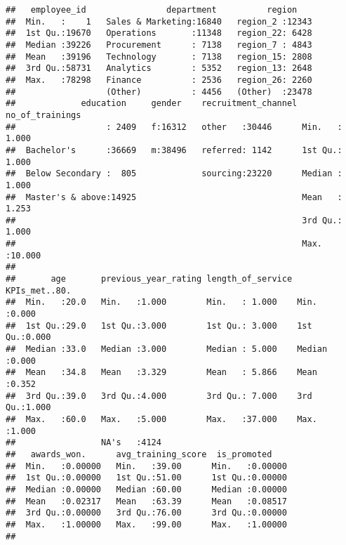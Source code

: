 \documentclass[
]{article}
\newenvironment{Shaded}{\begin{snugshade}}{\end{snugshade}}
\newcommand{\KeywordTok}[1]{\textcolor[rgb]{0.13,0.29,0.53}{\textbf{#1}}}
\newcommand{\NormalTok}[1]{#1}
\newcommand{\OperatorTok}[1]{\textcolor[rgb]{0.81,0.36,0.00}{\textbf{#1}}}
\newcommand{\StringTok}[1]{\textcolor[rgb]{0.31,0.60,0.02}{#1}}
\begin{document}
\begin{verbatim}
##   employee_id                department          region     
##  Min.   :    1   Sales & Marketing:16840   region_2 :12343  
##  1st Qu.:19670   Operations       :11348   region_22: 6428  
##  Median :39226   Procurement      : 7138   region_7 : 4843  
##  Mean   :39196   Technology       : 7138   region_15: 2808  
##  3rd Qu.:58731   Analytics        : 5352   region_13: 2648  
##  Max.   :78298   Finance          : 2536   region_26: 2260  
##                  (Other)          : 4456   (Other)  :23478  
##             education     gender    recruitment_channel no_of_trainings 
##                  : 2409   f:16312   other   :30446      Min.   : 1.000  
##  Bachelor's      :36669   m:38496   referred: 1142      1st Qu.: 1.000  
##  Below Secondary :  805             sourcing:23220      Median : 1.000  
##  Master's & above:14925                                 Mean   : 1.253  
##                                                         3rd Qu.: 1.000  
##                                                         Max.   :10.000  
##                                                                         
##       age       previous_year_rating length_of_service KPIs_met..80.  
##  Min.   :20.0   Min.   :1.000        Min.   : 1.000    Min.   :0.000  
##  1st Qu.:29.0   1st Qu.:3.000        1st Qu.: 3.000    1st Qu.:0.000  
##  Median :33.0   Median :3.000        Median : 5.000    Median :0.000  
##  Mean   :34.8   Mean   :3.329        Mean   : 5.866    Mean   :0.352  
##  3rd Qu.:39.0   3rd Qu.:4.000        3rd Qu.: 7.000    3rd Qu.:1.000  
##  Max.   :60.0   Max.   :5.000        Max.   :37.000    Max.   :1.000  
##                 NA's   :4124                                          
##   awards_won.      avg_training_score  is_promoted     
##  Min.   :0.00000   Min.   :39.00      Min.   :0.00000  
##  1st Qu.:0.00000   1st Qu.:51.00      1st Qu.:0.00000  
##  Median :0.00000   Median :60.00      Median :0.00000  
##  Mean   :0.02317   Mean   :63.39      Mean   :0.08517  
##  3rd Qu.:0.00000   3rd Qu.:76.00      3rd Qu.:0.00000  
##  Max.   :1.00000   Max.   :99.00      Max.   :1.00000  
## 
\end{verbatim}

\begin{Shaded}
\end{Shaded}
\end{document}
